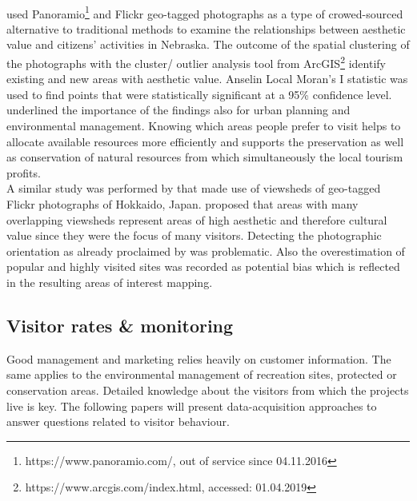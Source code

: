 \paragraph*{\textcite{Figueroa-Alfaro2017}} used Panoramio\footnote{https://www.panoramio.com/, out of service since 04.11.2016} and Flickr geo-tagged photographs as a type of crowed-sourced alternative to traditional methods to examine the relationships between aesthetic value and citizens' activities in Nebraska. The outcome of the spatial clustering of the photographs with the cluster/ outlier analysis tool from ArcGIS\footnote{https://www.arcgis.com/index.html, accessed: 01.04.2019} identify existing and new areas with aesthetic value. Anselin Local Moran's I statistic was used to find points that were statistically significant at a 95\% confidence level. \citeauthor{Figueroa-Alfaro2017} underlined the importance of the findings also for urban planning and environmental management. Knowing which areas people prefer to visit helps to allocate available resources more efficiently and supports the preservation as well as conservation of natural resources from which simultaneously the local tourism profits. \\
\newline
A similar study was performed by \textcite{Yoshimura2017} that made use of viewsheds of geo-tagged Flickr photographs of Hokkaido, Japan. \citeauthor{Yoshimura2017} proposed that areas with many overlapping viewsheds represent areas of high aesthetic and therefore cultural value since they were the focus of many visitors. Detecting the photographic orientation as already proclaimed by \textcite{Unknown2013} was problematic. Also the overestimation of popular and highly visited sites was recorded as potential bias which is reflected in the resulting areas of interest mapping.


\subsection{Visitor rates \& monitoring}
Good management and marketing relies heavily on customer information. The same applies to the environmental management of recreation sites, protected or conservation areas. Detailed knowledge about the visitors from which the projects live is key. The following papers will present data-acquisition approaches to answer questions related to visitor behaviour.  

